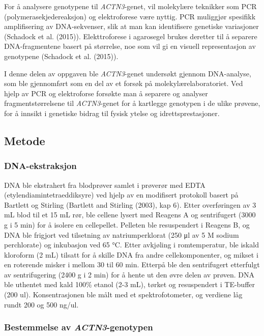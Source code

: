 \documentclass[
  letterpaper,
  DIV=11,
  numbers=noendperiod]{scrreprt}
\begin{document}
For å analysere genotypene til \emph{ACTN3}-genet, vil molekylære
teknikker som PCR (polymerasekjedereaksjon) og elektroforese være
nyttig. PCR muliggjør spesifikk amplifisering av DNA-sekvenser, slik at
man kan identifisere genetiske variasjoner (Schadock et al. (2015)).
Elekttroforese i agarosegel brukes deretter til å separere
DNA-fragmentene basert på størrelse, noe som vil gi en visuell
representasjon av genotypene (Schadock et al. (2015)).

I denne delen av oppgaven ble \emph{ACTN3}-genet undersøkt gjennom
DNA-analyse, som ble gjennomført som en del av et forsøk på
molekylærelaboratoriet. Ved hjelp av PCR og elektroforse forsøkte man å
separere og analyser fragmentstørrelsene til \emph{ACTN3}-genet for å
kartlegge genotypen i de ulike prøvene, for å innsikt i genetiske bidrag
til fysisk ytelse og idrettsprestasjoner.

\subsection{Metode}\label{metode-2}

\subsubsection{DNA-ekstraksjon}\label{dna-ekstraksjon}

DNA ble ekstrahert fra blodprøver samlet i prøverør med EDTA
(etylendiamintetraeddiksyre) ved hjelp av en modifisert protokoll basert
på Bartlett og Stirling (Bartlett and Stirling (2003), kap 6). Etter
overføringen av 3 mL blod til et 15 mL rør, ble cellene lysert med
Reagens A og sentrifugert (3000 g i 5 min) for å isolere en cellepellet.
Pelleten ble resuspendert i Reagens B, og DNA ble frigjort ved
tilsetning av natriumperklorat (250 μl av 5 M sodium perchlorate) og
inkubasjon ved 65 °C. Etter avkjøling i romtemperatur, ble iskald
kloroform (2 mL) tilsatt for å skille DNA fra andre cellekomponenter, og
mikset i en roterende misker i mellom 30 til 60 min. Etterpå ble den
sentrifugert etterfulgt av sentrifugering (2400 g i 2 min) for å hente
ut den øvre delen av prøven. DNA ble uthentet med kald 100\% etanol (2-3
mL), tørket og resuspendert i TE-buffer (200 ul). Konsentrasjonen ble
målt med et spektrofotometer, og verdiene låg rundt 200 og 500 ng/ul.

\subsubsection{\texorpdfstring{Bestemmelse av
\emph{ACTN3}-genotypen}{Bestemmelse av ACTN3-genotypen}}\label{bestemmelse-av-actn3-genotypen}
\end{document}
